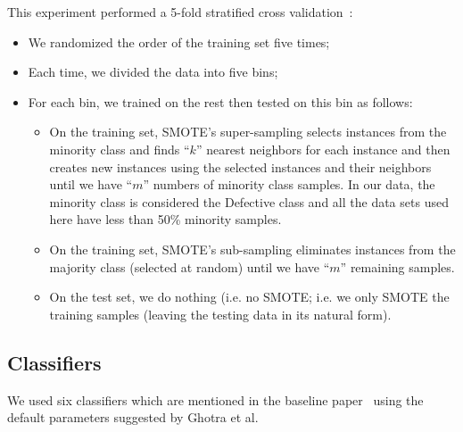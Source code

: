 \documentclass[sigconf,review, anonymous]{acmart}
\newcommand{\bi}{\begin{itemize}[leftmargin=0.4cm]}
\newcommand{\ei}{\end{itemize}}
\theoremstyle{break}
\theoremstyle{break}
\begin{document}
This experiment performed a 5-fold stratified cross validation~\cite{refaeilzadeh2009cross}:
\bi
\item We randomized the order of the training set five times;
\item Each time, we divided the data into five bins;
\item For each bin, we trained on the rest then tested
on this bin as follows:
\bi
\item
On the training set, SMOTE's super-sampling selects instances from the minority class and finds ``$k$'' nearest neighbors for each instance and then creates new instances using the selected instances and their neighbors until we have ``$m$'' numbers of minority class samples. 
In our data, 
 the minority class is considered the Defective class and all the data sets used here have less than 50\% minority samples.
\item
On the training set, SMOTE's sub-sampling  eliminates instances from the majority class (selected at random)
until we have ``$m$'' remaining samples.
 
\item On the test set, we do nothing (i.e. no SMOTE;
i.e. we only SMOTE the training samples
(leaving the  testing data in its natural form).
\ei
\ei

\subsection{\textbf{Classifiers}}
\label{sect:classes}

We used six classifiers which are mentioned in the baseline paper~\cite{ghotra2015revisiting}
using the default
parameters  suggested by Ghotra et al.
\end{document}
